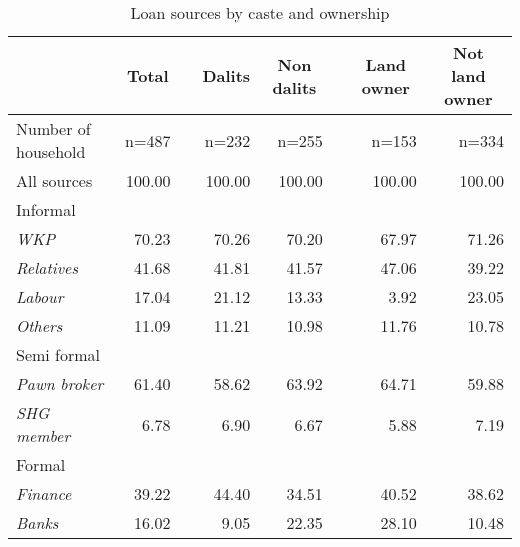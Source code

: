 \begin{table}[htbp]
  \center
  \caption{Loan sources by caste and ownership}
    \begin{tabular}{lrrrrrrr}
    \toprule
          & \multicolumn{1}{c}{Total} &       & \multicolumn{1}{c}{Dalits} & \multicolumn{1}{c}{Non dalits} &       & \multicolumn{1}{c}{Land owner} & \multicolumn{1}{c}{Not land owner} \\
    \midrule
    Number of household & n=487 &       & n=232 & n=255 &       & n=153 & n=334 \\
    All sources & 100.00 &       & 100.00 & 100.00 &       & 100.00 & 100.00 \\
    Informal &       &       &       &       &       &       &  \\
    \hspace*{0.2cm} \textit{WKP} & 70.23 &       & 70.26 & 70.20 &       & 67.97 & 71.26 \\
    \hspace*{0.2cm} \textit{Relatives} & 41.68 &       & 41.81 & 41.57 &       & 47.06 & 39.22 \\
    \hspace*{0.2cm} \textit{Labour} & 17.04 &       & 21.12 & 13.33 &       & 3.92  & 23.05 \\
    \hspace*{0.2cm} \textit{Others} & 11.09 &       & 11.21 & 10.98 &       & 11.76 & 10.78 \\
    Semi formal &       &       &       &       &       &       &  \\
    \hspace*{0.2cm} \textit{Pawn broker} & 61.40 &       & 58.62 & 63.92 &       & 64.71 & 59.88 \\
    \hspace*{0.2cm} \textit{SHG member} & 6.78  &       & 6.90  & 6.67  &       & 5.88  & 7.19 \\
    Formal &       &       &       &       &       &       &  \\
    \hspace*{0.2cm} \textit{Finance} & 39.22 &       & 44.40 & 34.51 &       & 40.52 & 38.62 \\
    \hspace*{0.2cm} \textit{Banks} & 16.02 &       & 9.05  & 22.35 &       & 28.10 & 10.48 \\
    \bottomrule
    \end{tabular}%
  \label{appendix:clientelecaste}%
\end{table}%
